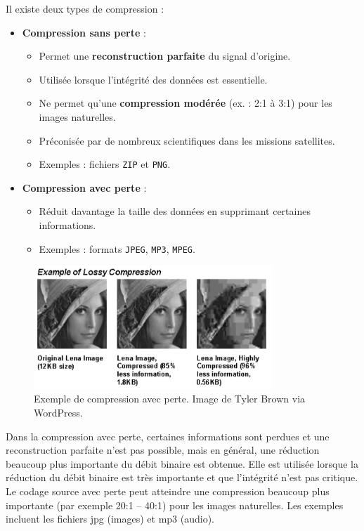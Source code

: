 Il existe deux types de compression :
\begin{itemize}
    \item \textbf{Compression sans perte} :
    \begin{itemize}
        \item Permet une \textbf{reconstruction parfaite} du signal d'origine.
        \item Utilisée lorsque l'intégrité des données est essentielle.
        \item Ne permet qu'une \textbf{compression modérée} (ex. : 2:1 à 3:1) pour les images naturelles.
        \item Préconisée par de nombreux scientifiques dans les missions satellites.
        \item Exemples : fichiers \texttt{ZIP} et \texttt{PNG}.
    \end{itemize}
    \item \textbf{Compression avec perte} :
    \begin{itemize}
        \item Réduit davantage la taille des données en supprimant certaines informations.
        \item Exemples : formats \texttt{JPEG}, \texttt{MP3}, \texttt{MPEG}.
    \end{itemize}
\end{itemize}
\begin{figure}[H] %
    \centering
    \includegraphics[width=0.8\textwidth]{figures/6-22.jpg}
    \caption{Exemple de compression avec perte. Image de Tyler Brown via WordPress.}
    \label{fig:communication2}
\end{figure}
Dans la compression avec perte, certaines informations sont perdues et une reconstruction parfaite n'est pas possible, mais en général, une réduction beaucoup plus importante du débit binaire est obtenue. Elle est utilisée lorsque la réduction du débit binaire est très importante et que l'intégrité n'est pas critique. Le codage source avec perte peut atteindre une compression beaucoup plus importante (par exemple 20:1 – 40:1) pour les images naturelles. Les exemples incluent les fichiers jpg (images) et mp3 (audio).
